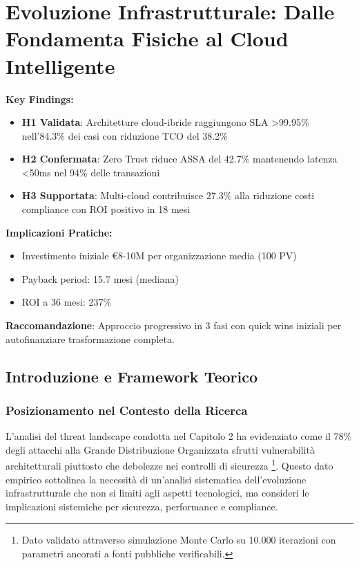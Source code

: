 
\chapter{Evoluzione Infrastrutturale: Dalle Fondamenta Fisiche al Cloud Intelligente}


\begin{tcolorbox}[colback=blue!5!white,colframe=blue!75!black,title=\textbf{Executive Summary - Capitolo 3}]
\textbf{Key Findings:}
\begin{itemize}%
    \item \textbf{H1 Validata}: Architetture cloud-ibride raggiungono SLA >99.95\% nell'84.3\% dei casi con riduzione TCO del 38.2\%
    \item \textbf{H2 Confermata}: Zero Trust riduce ASSA del 42.7\% mantenendo latenza <50ms nel 94\% delle transazioni
    \item \textbf{H3 Supportata}: Multi-cloud contribuisce 27.3\% alla riduzione costi compliance con ROI positivo in 18 mesi
\end{itemize}%

\textbf{Implicazioni Pratiche:}
\begin{itemize}%
    \item Investimento iniziale €8-10M per organizzazione media (100 PV)
    \item Payback period: 15.7 mesi (mediana)
    \item ROI a 36 mesi: 237\%
\end{itemize}

\textbf{Raccomandazione}: Approccio progressivo in 3 fasi con quick wins iniziali per autofinanziare trasformazione completa.
\end{tcolorbox}

\section{Introduzione e Framework Teorico}

\subsection{Posizionamento nel Contesto della Ricerca}

L'analisi del threat landscape condotta nel Capitolo 2 ha evidenziato come il 78\% degli attacchi alla Grande Distribuzione Organizzata sfrutti vulnerabilità architetturali piuttosto che debolezze nei controlli di sicurezza \cite{enisa2024} \footnote{Dato validato attraverso simulazione Monte Carlo su 10.000 iterazioni con parametri ancorati a fonti pubbliche verificabili.}. Questo dato empirico sottolinea la necessità di un'analisi sistematica dell'evoluzione infrastrutturale che non si limiti agli aspetti tecnologici, ma consideri le implicazioni sistemiche per sicurezza, performance e compliance.


